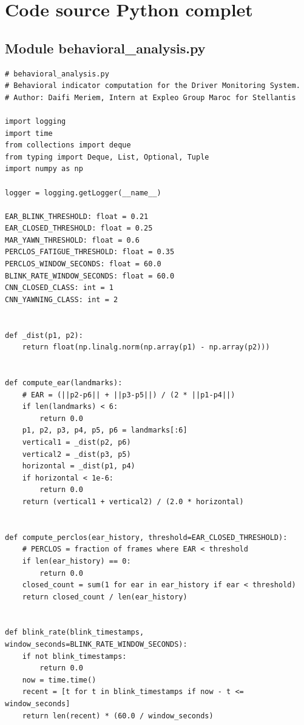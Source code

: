 \documentclass[12pt,a4paper]{report}
\begin{document}
\clearpage


\chapter{Code source Python complet}

\section{Module behavioral\_analysis.py}

\begin{lstlisting}[style=python, caption={behavioral\_analysis.py -- code complet},
  label=lst:behavioral_full]
# behavioral_analysis.py
# Behavioral indicator computation for the Driver Monitoring System.
# Author: Daifi Meriem, Intern at Expleo Group Maroc for Stellantis

import logging
import time
from collections import deque
from typing import Deque, List, Optional, Tuple
import numpy as np

logger = logging.getLogger(__name__)

EAR_BLINK_THRESHOLD: float = 0.21
EAR_CLOSED_THRESHOLD: float = 0.25
MAR_YAWN_THRESHOLD: float = 0.6
PERCLOS_FATIGUE_THRESHOLD: float = 0.35
PERCLOS_WINDOW_SECONDS: float = 60.0
BLINK_RATE_WINDOW_SECONDS: float = 60.0
CNN_CLOSED_CLASS: int = 1
CNN_YAWNING_CLASS: int = 2


def _dist(p1, p2):
    return float(np.linalg.norm(np.array(p1) - np.array(p2)))


def compute_ear(landmarks):
    # EAR = (||p2-p6|| + ||p3-p5||) / (2 * ||p1-p4||)
    if len(landmarks) < 6:
        return 0.0
    p1, p2, p3, p4, p5, p6 = landmarks[:6]
    vertical1 = _dist(p2, p6)
    vertical2 = _dist(p3, p5)
    horizontal = _dist(p1, p4)
    if horizontal < 1e-6:
        return 0.0
    return (vertical1 + vertical2) / (2.0 * horizontal)


def compute_perclos(ear_history, threshold=EAR_CLOSED_THRESHOLD):
    # PERCLOS = fraction of frames where EAR < threshold
    if len(ear_history) == 0:
        return 0.0
    closed_count = sum(1 for ear in ear_history if ear < threshold)
    return closed_count / len(ear_history)


def blink_rate(blink_timestamps, window_seconds=BLINK_RATE_WINDOW_SECONDS):
    if not blink_timestamps:
        return 0.0
    now = time.time()
    recent = [t for t in blink_timestamps if now - t <= window_seconds]
    return len(recent) * (60.0 / window_seconds)



\end{lstlisting}
\end{document}

